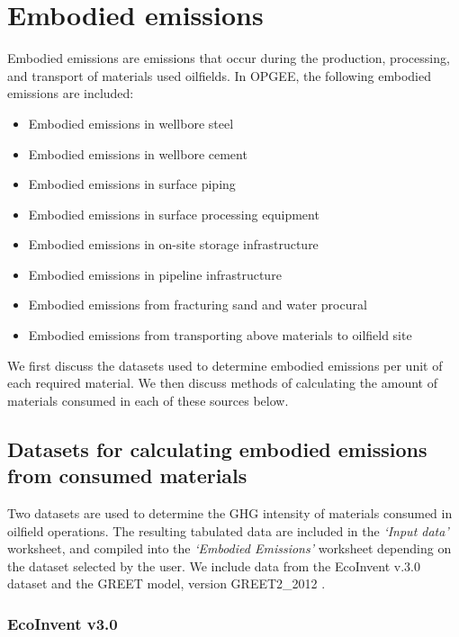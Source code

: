 \documentclass[11pt]{report}
\newcommand{\marg}[1]{{\footnotesize\textit{\textcolor{stanford}{'#1'}}}}
\newcommand{\marginnote}[1]{\marginpar{\marg{#1}}}
\newcommand{\sheet}[1]{\textit{`{#1}'}}
\begin{document}
{{{{%
\section{Embodied emissions} \label{sec:embodied_emissions}

Embodied emissions are emissions that occur during the production, processing, and transport of materials used oilfields. In OPGEE, the following embodied emissions are included:
\begin{itemize}
\item Embodied emissions in wellbore steel
\item Embodied emissions in wellbore cement
\item Embodied emissions in surface piping
\item Embodied emissions in surface processing equipment
\item Embodied emissions in on-site storage infrastructure
\item Embodied emissions in pipeline infrastructure
\item Embodied emissions from fracturing sand and water procural
\item Embodied emissions from transporting above materials to oilfield site
\end{itemize}

We first discuss the datasets used to determine embodied emissions per unit of each required material. We then discuss methods of calculating the amount of materials consumed in each of these sources below. 

\subsection{Datasets for calculating embodied emissions from consumed materials}

Two datasets are used to determine the GHG intensity of materials consumed in oilfield operations. The resulting tabulated data are included in the \sheet{Input data} worksheet, and compiled into the \sheet{Embodied Emissions} worksheet depending on the dataset \marginnote{Embodied Emissions 1.3} selected by the user. We include data from the EcoInvent v.3.0 dataset \cite{ecoinvent2014} and the GREET model, version GREET2\_2012 \cite{wang2012}.

\subsubsection{EcoInvent v3.0}

}}}}
\end{document}

